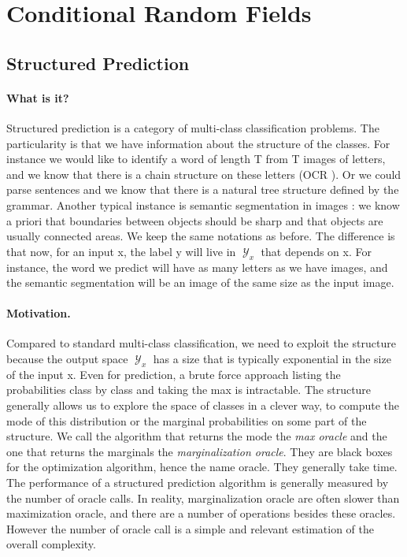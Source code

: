 \documentclass{article}
\DeclareMathOperator{\1}{\mathbb{1}}
\DeclareMathOperator{\Y}{\mathcal{Y}}
\begin{document}


\clearpage
\section{Conditional Random Fields}

\subsection{Structured Prediction}

\paragraph{What is it?}
Structured prediction is a category of multi-class classification problems.
The particularity is that we have information about the structure of the classes.
For instance we would like to identify a word of length T from T images of letters, and we know that there is a chain structure on these letters (OCR ).
Or we could parse sentences and we know that there is a natural tree structure defined by the grammar.
Another typical instance is semantic segmentation in images : we know a priori that boundaries between objects should be sharp and that objects are usually connected areas.
We keep the same notations as before.
The difference is that now, for an input x, the label y will live in $\Y_x$ that depends on x.
For instance, the word we predict will have as many letters as we have images, and the semantic segmentation will be an image of the same size as the input image. 

\paragraph{Motivation.}
Compared to standard multi-class classification, we need to exploit the structure because the output space $\Y_x$ has a size that is typically exponential in the size of the input x.
Even for prediction, a brute force approach listing the probabilities class by class and taking the max is intractable.
The structure generally allows us to explore the space of classes in a clever way, to compute the mode of this distribution or the marginal probabilities on some part of the structure.
We call the algorithm that returns the mode the \textit{max oracle} and the one that returns the marginals the \textit{marginalization oracle}.
They are black boxes for the optimization algorithm, hence the name oracle.
They generally take time.
The performance of a structured prediction algorithm is generally measured by the number of oracle calls.
In reality, marginalization oracle are often slower than maximization oracle, and there are a number of operations besides these oracles.
However the number of oracle call is a simple and relevant estimation of the overall complexity.
\end{document}
